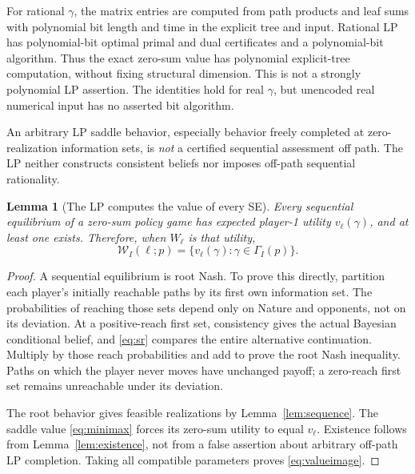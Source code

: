 \documentclass[11pt,a4paper]{article}
\numberwithin{equation}{section}
\newtheorem{lemma}[theorem]{Lemma}
\theoremstyle{definition}
\begin{document}
For rational \(\gamma\), the matrix entries are computed from path
products and leaf sums with polynomial bit length and time in the
explicit tree and input. Rational LP has polynomial-bit optimal
primal and dual certificates and a polynomial-bit algorithm.
Thus the exact zero-sum value has polynomial explicit-tree computation,
without fixing structural dimension. This is not a strongly polynomial
LP assertion. The identities hold for real \(\gamma\), but unencoded
real numerical input has no asserted bit algorithm.

An arbitrary LP saddle behavior, especially behavior freely completed
at zero-realization information sets, is \emph{not} a certified
sequential assessment off path. The LP neither constructs consistent
beliefs nor imposes off-path sequential rationality.

\begin{lemma}[The LP computes the value of every SE]\label{lem:sevalue}
Every sequential equilibrium of a zero-sum policy game has expected
player-1 utility \(v_\ell(\gamma)\), and at least one exists.
Therefore, when \(W_\ell\) is that utility,
\begin{equation}\label{eq:valueimage}
 \mathcal W_I(\ell;p)
       =\{v_\ell(\gamma):\gamma\in\Gamma_I(p)\}.
\end{equation}
\end{lemma}
\begin{proof}
A sequential equilibrium is root Nash. To prove this directly,
partition each player's initially reachable paths by its first own
information set. The probabilities of reaching those sets depend only
on Nature and opponents, not on its deviation. At a positive-reach
first set, consistency gives the actual Bayesian conditional belief,
and \eqref{eq:sr} compares the entire alternative continuation.
Multiply by those reach probabilities and add to prove the root
Nash inequality. Paths on which the player never moves have unchanged
payoff; a zero-reach first set remains unreachable under its deviation.

The root behavior gives feasible realizations by Lemma~\ref{lem:sequence}.
The saddle value \eqref{eq:minimax} forces its zero-sum utility to
equal \(v_\ell\). Existence follows from Lemma~\ref{lem:existence},
not from a false assertion about arbitrary off-path LP completion.
Taking all compatible parameters proves \eqref{eq:valueimage}.
\end{proof}
\end{document}
